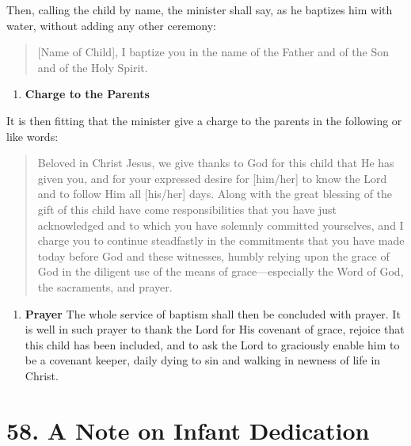 \documentclass[
]{book}
\providecommand{\tightlist}{%
  \setlength{\itemsep}{0pt}\setlength{\parskip}{0pt}}
\begin{document}
\begin{enumerate}
  Then, calling the child by name, the minister shall say, as he baptizes him with water, without adding any other ceremony:

  \begin{quote}
  {[}Name of Child{]}, I baptize you in the name of the Father and of the Son and of the Holy Spirit.
  \end{quote}

  \begin{enumerate}
  \def\labelenumii{\alph{enumii}.}
  \setcounter{enumii}{7}
  \tightlist
  \item
    \textbf{Charge to the Parents}
  \end{enumerate}

  It is then fitting that the minister give a charge to the parents in the following or like words:

  \begin{quote}
  Beloved in Christ Jesus, we give thanks to God for this child that He has given you, and for your expressed desire for {[}him/her{]} to know the Lord and to follow Him all {[}his/her{]} days. Along with the great blessing of the gift of this child have come responsibilities that you have just acknowledged and to which you have solemnly committed yourselves, and I charge you to continue steadfastly in the commitments that you have made today before God and these witnesses, humbly relying upon the grace of God in the diligent use of the means of grace---especially the Word of God, the sacraments, and prayer.
  \end{quote}

  \begin{enumerate}
  \def\labelenumii{\roman{enumii}.}
  \tightlist
  \item
    \textbf{Prayer}
    The whole service of baptism shall then be concluded with prayer. It is well in such prayer to thank the Lord for His covenant of grace, rejoice that this child has been included, and to ask the Lord to graciously enable him to be a covenant keeper, daily dying to sin and walking in newness of life in Christ.
  \end{enumerate}
\end{enumerate}

\hypertarget{a-note-on-infant-dedication}{%
\section*{58. A Note on Infant Dedication}\label{a-note-on-infant-dedication}}
\end{document}
